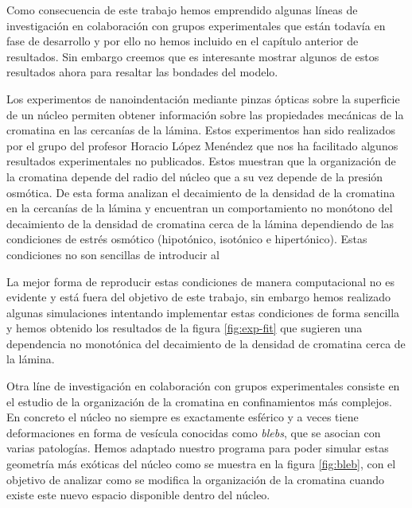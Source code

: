 Como consecuencia de este trabajo hemos emprendido algunas líneas de investigación en colaboración con grupos experimentales que están todavía en fase de desarrollo y por ello no hemos incluido en el capítulo anterior de resultados. Sin embargo creemos que es interesante mostrar algunos de estos resultados ahora para resaltar las bondades del modelo.

Los experimentos de nanoindentación mediante pinzas ópticas sobre la superficie de un núcleo permiten obtener información sobre las propiedades mecánicas de la cromatina en las cercanías de la lámina. Estos experimentos han sido realizados por el grupo del profesor Horacio López Menéndez que nos ha facilitado algunos resultados experimentales no publicados. Estos muestran que la organización de la cromatina depende del radio del núcleo que a su vez depende de la presión osmótica. De esta forma analizan el decaimiento de la densidad de la cromatina en la cercanías de la lámina y encuentran un comportamiento no monótono del decaimiento de la densidad de cromatina cerca de la lámina dependiendo de las condiciones de estrés osmótico (hipotónico, isotónico e hipertónico). Estas condiciones no son sencillas de introducir al

La mejor forma de reproducir estas condiciones de manera computacional no es evidente y está fuera del objetivo de este trabajo, sin embargo hemos realizado algunas simulaciones intentando implementar estas condiciones de forma sencilla y hemos obtenido los resultados de la figura \ref{fig:exp-fit} que sugieren una dependencia no monotónica del decaimiento de la densidad de cromatina cerca de la lámina.

Otra líne de investigación en colaboración con grupos experimentales consiste en el estudio de la organización de la cromatina en confinamientos más complejos. En concreto el núcleo no siempre es exactamente esférico y a veces tiene deformaciones en forma de vesícula conocidas como \textit{blebs}, que se asocian con varias patologías. Hemos adaptado nuestro programa para poder simular estas geometría más exóticas del núcleo como se muestra en la figura \ref{fig:bleb}, con el objetivo de analizar como se modifica la organización de la cromatina cuando existe este nuevo espacio disponible dentro del núcleo.

